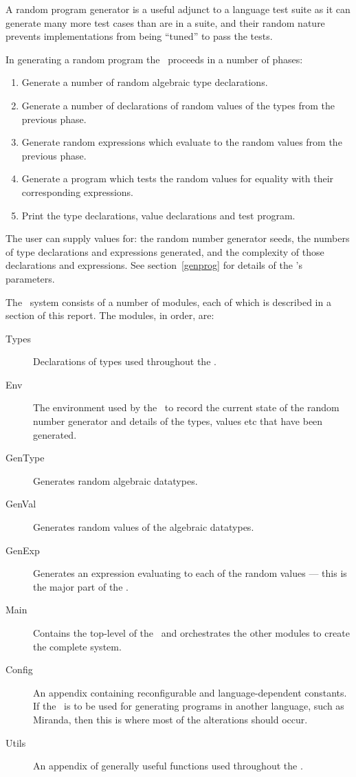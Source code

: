 A random program generator is a useful adjunct to a language test suite
as it can generate many more test cases than are in a suite, and their
random nature prevents implementations from being ``tuned'' to pass the
tests.

In generating a random program the \HPG\ proceeds in a number of phases:
\begin{enumerate}
\item Generate a number of random algebraic type declarations.
\item Generate a number of declarations of random values of the types from the
    previous phase.
\item Generate random expressions which evaluate to the random
    values from the previous phase.
\item Generate a program which tests the random values for
    equality with their corresponding expressions.
\item Print the type declarations, value declarations and test program.
\end{enumerate}

The user can supply values for: the random number generator seeds, the
numbers of type declarations and expressions generated, and the complexity
of those declarations and expressions.
See section~\ref{genprog} for details of the \HPG's parameters.

The \HPG\ system consists of a number of modules, each of which is described
in a section of this report.
The modules, in order, are:
\begin{description}
\item[Types] Declarations of types used throughout the \HPG.
\item[Env] The environment used by the \HPG\ to record the current state of
    the random number generator and details of the types, values etc
    that have been generated.
\item[GenType] Generates random algebraic datatypes.
\item[GenVal] Generates random values of the algebraic datatypes.
\item[GenExp] Generates an expression evaluating to each of the random
    values --- this is the major part of the \HPG.
\item[Main] Contains the top-level of the \HPG\ and orchestrates
    the other modules to create the complete system.
\item[Config] An appendix containing reconfigurable and language-dependent
    constants.
    If the \HPG\ is to be used for generating programs in another
    language, such as Miranda, then this is where most of the alterations
    should occur.
\item[Utils] An appendix of generally useful functions used throughout
    the \HPG.
\end{description}

